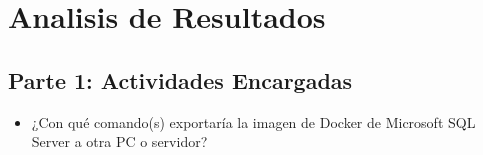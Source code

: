 \section{Analisis  de Resultados} 


\subsection{Parte 1: Actividades Encargadas}
	\begin{itemize}
		\item ¿Con qué comando(s) exportaría la imagen de Docker de Microsoft SQL Server a otra PC o servidor?
		
	\end{itemize}



